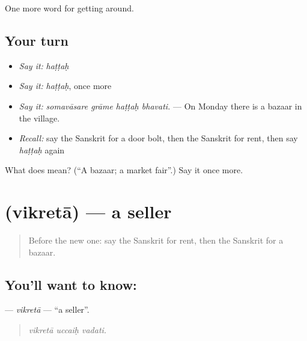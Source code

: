 \begin{grammarlens}[title={What you've built}]
One more word for getting around.
\end{grammarlens}

\subsection*{Your turn}
\begin{itemize}
\raggedright
  \item \emph{Say it:} \emph{haṭṭaḥ}
  \item \emph{Say it:} \emph{haṭṭaḥ}, once more
  \item \emph{Say it:} \emph{somavāsare grāme haṭṭaḥ bhavati.} — On Monday there is a bazaar in the village.
  \item \emph{Recall:} say the Sanskrit for a door bolt, then the Sanskrit for rent, then say \emph{haṭṭaḥ} again
\end{itemize}

\begin{tcolorbox}[breakable,colback=teal!4,colframe=teal!35!black,title={Before you move on}]
What does  mean? (\textquotedblleft{}A bazaar; a market fair\textquotedblright{}.) Say it once more.
\end{tcolorbox}
\section[\texorpdfstring{\sk{विक्रेता} (vikretā)}{विक्रेता (vikretā)}]{ (vikretā) — a seller}

\label{lesson:SA-C430-vikreta}



\begin{quote}
Before the new one: say the Sanskrit for rent, then the Sanskrit for a bazaar.
\end{quote}

\subsection*{You'll want to know: }
\textbf{} — \emph{vikretā} — \textquotedblleft{}a seller\textquotedblright{}.

\begin{quote}
  
\end{quote}

\begin{quote}
\emph{vikretā uccaiḥ vadati.}
\end{quote}

